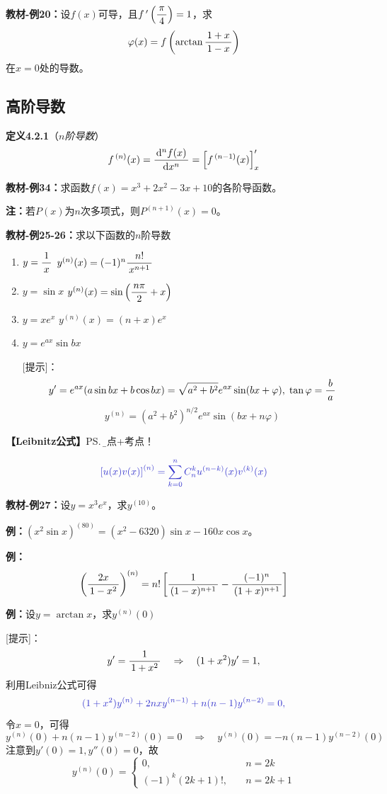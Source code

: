 {\bf 教材-例20：}设$f(x)$可导，且$f\,'\left(\displaystyle\frac{\,{\pi}\,}{\,{4}\,}\right)=1$，求
$$\varphi(x)=f\left(\arctan\displaystyle\frac{\,{1+x}\,}{\,{1-x}\,}\right)$$
在$x=0$处的导数。

\subsection{高阶导数}

{\bf 定义4.2.1}（{\it $n$阶导数}）
$$f^{\,(n)}(x)=\displaystyle\frac{\,{\mathrm{d}^nf(x)}\,}{\,{\mathrm{d} x^n}\,}=\left[f^{\,(n-1)}(x)\right]'_x$$

{\bf 教材-例34：}求函数$f(x)=x^3+2x^2-3x+10$的各阶导函数。

{\bf 注：}若$P(x)$为$n$次多项式，则$P^{(n+1)}(x)=0$。

{\bf 教材-例25-26：}求以下函数的$n$阶导数
\begin{enumerate}[(1)]
  \setlength{\itemindent}{1cm}
  \item $y=\displaystyle\frac{\,{1}\,}{\,{x}\,}$ \hfill $y^{(n)}(x)=(-1)^n\displaystyle\frac{\,{n!}\,}{\,{x^{n+1}}\,}$ 
  \item $y=\sin x$ \hfill
  $y^{(n)}(x)=\sin\left(\displaystyle\frac{\,{n\pi}\,}{\,{2}\,}+x\right)$ 
  \item $y=xe^x$ \hfill $y^{(n)}(x)=(n+x)e^x$
  \item $y=e^{ax}\sin bx$

[提示]：
$$y'=e^{ax}(a\sin bx+b\cos
bx)=\sqrt{a^2+b^2}e^{ax}\sin(bx+\varphi),
\;\tan\varphi=\displaystyle\frac{\,{b}\,}{\,{a}\,}$$
$$y^{(n)}=\left(a^2+b^2\right)^{n/2}e^{ax}\sin(bx+n\varphi)$$ 
\end{enumerate}

{\bf 【Leibnitz公式】}\ps{\b 难点+考点！}

$${\b{\left[u(x)v(x)\right]^{(n)}=
\sum\limits_{k=0}^nC_n^ku^{(n-k)}(x)v^{(k)}(x)}}$$

{\bf 教材-例27：}设$y=x^3e^x$，求$y^{(10)}$。

{\bf 例：}$(x^2\sin x)^{(80)}=(x^2-6320)\sin x-160x\cos x$。

{\bf 例：}
$$\left(\displaystyle\frac{\,{2x}\,}{\,{1-x^2}\,}\right)^{(n)}=n!\left[\displaystyle\frac{\,{1}\,}{\,{(1-x)^{n+1}}\,}
-\displaystyle\frac{\,{(-1)^n}\,}{\,{(1+x)^{n+1}}\,}\right]$$

{\bf 例：}设$y=\arctan x$，求$y^{(n)}(0)$

[提示]：
$$y'=\displaystyle\frac{\,{1}\,}{\,{1+x^2}\,}\quad \Rightarrow\quad (1+x^2)y'=1,$$
利用Leibniz公式可得
$${\b (1+x^2)y^{(n)}+2nxy^{(n-1)}+n(n-1)y^{(n-2)}=0,}$$
令$x=0$，可得
$$y^{(n)}(0)+n(n-1)y^{(n-2)}(0)=0\quad
\Rightarrow\quad y^{(n)}(0)=-n(n-1)y^{(n-2)}(0)$$
注意到$y'(0)=1,y''(0)=0$，故
$$y^{(n)}(0)=\left\{\begin{array}{ll}
0,\quad& n=2k\\
(-1)^k(2k+1)!,\quad& n=2k+1
\end{array}\right.$$


